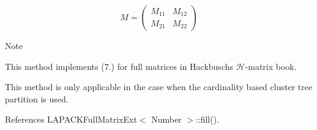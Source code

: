 \[ M = \begin{pmatrix} M_{11} & M_{12} \\ M_{21} & M_{22} \end{pmatrix} \]


\begin{DoxyDescription}
\item[Note ]
\begin{DoxyEnumerate}
\item This method implements (7.) for full matrices in Hackbusch\textquotesingle{}s $\mathcal{H}$-\/matrix book.
\item This method is only applicable in the case when the cardinality based cluster tree partition is used.  
\end{DoxyEnumerate}
\end{DoxyDescription}

References L\+A\+P\+A\+C\+K\+Full\+Matrix\+Ext$<$ Number $>$\+::fill().

\mbox{\label{classLAPACKFullMatrixExt_a4baa5d6642259df28cf9f32cb6b71a25}} 
